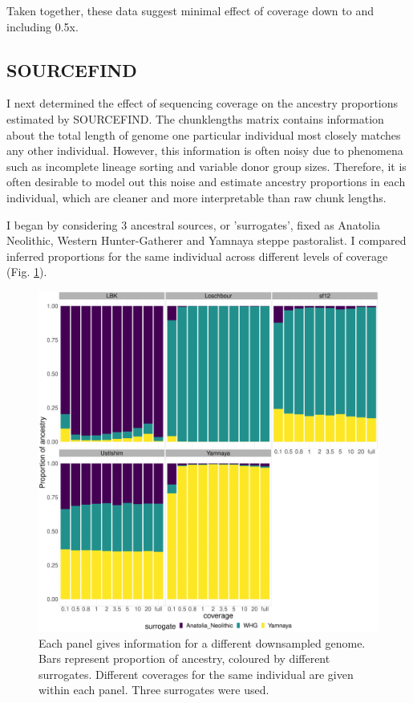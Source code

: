 Taken together, these data suggest minimal effect of coverage down to and including 0.5x.

\subsection{SOURCEFIND}

I next determined the effect of sequencing coverage on the ancestry proportions estimated by SOURCEFIND. The chunklengths matrix contains information about the total length of genome one particular individual most closely matches any other individual. However, this information is often noisy due to phenomena such as incomplete lineage sorting and variable donor group sizes. Therefore, it is often desirable to model out this noise and estimate ancestry proportions in each individual, which are cleaner and more interpretable than raw chunk lengths. 

I began by considering 3 ancestral sources, or 'surrogates', fixed as Anatolia Neolithic, Western Hunter-Gatherer and Yamnaya steppe pastoralist. I compared inferred proportions for the same individual across different levels of coverage (Fig. \ref{fig:3pop_SF_downsampled}). 

\begin{figure}[htp]
    \centering
    \includegraphics[width=1.0\textwidth]{../images/chapter1/3pop_SF_downsampled.pdf}
    \caption{Each panel gives information for a different downsampled genome. Bars represent proportion of ancestry, coloured by different surrogates. Different coverages for the same individual are given within each panel. Three surrogates were used.}
    \label{fig:3pop_SF_downsampled}
\end{figure}


